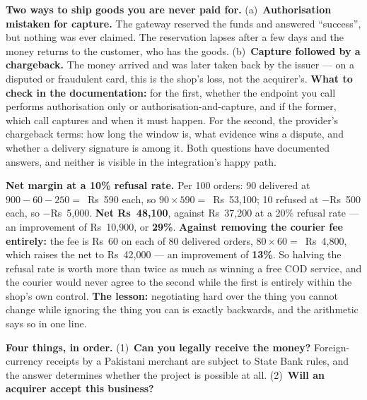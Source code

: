 \begin{ans}
  \item \textbf{Two ways to ship goods you are never paid for.}
        (a)~\textbf{Authorisation mistaken for capture.} The gateway reserved
        the funds and answered ``success'', but nothing was ever claimed. The
        reservation lapses after a few days and the money returns to the
        customer, who has the goods. (b)~\textbf{Capture followed by a
        chargeback.} The money arrived and was later taken back by the issuer
        --- on a disputed or fraudulent card, this is the shop's loss, not the
        acquirer's. \textbf{What to check in the documentation:} for the first,
        whether the endpoint you call performs authorisation only or
        authorisation-and-capture, and if the former, which call captures and
        when it must happen. For the second, the provider's chargeback terms:
        how long the window is, what evidence wins a dispute, and whether a
        delivery signature is among it. Both questions have documented answers,
        and neither is visible in the integration's happy path.
  \item \textbf{Net margin at a 10\% refusal rate.} Per 100 orders: 90
        delivered at $900 - 60 - 250 = $~Rs~590 each, so $90 \times 590 =
        $~Rs~53{,}100; 10 refused at $-$Rs~500 each, so $-$Rs~5{,}000.
        \textbf{Net Rs~48{,}100}, against Rs~37{,}200 at a 20\% refusal rate
        --- an improvement of Rs~10{,}900, or \textbf{29\%}.
        \textbf{Against removing the courier fee entirely:} the fee is Rs~60 on
        each of 80 delivered orders, $80 \times 60 = $~Rs~4{,}800, which raises
        the net to Rs~42{,}000 --- an improvement of \textbf{13\%}. So halving
        the refusal rate is worth more than twice as much as winning a free COD
        service, and the courier would never agree to the second while the
        first is entirely within the shop's own control. \textbf{The lesson:}
        negotiating hard over the thing you cannot change while ignoring the
        thing you can is exactly backwards, and the arithmetic says so in one
        line.
  \item \textbf{Four things, in order.} (1)~\textbf{Can you legally receive the
        money?} Foreign-currency receipts by a Pakistani merchant are subject
        to State Bank rules, and the answer determines whether the project is
        possible at all. (2)~\textbf{Will an acquirer accept this business?}

\end{ans}
